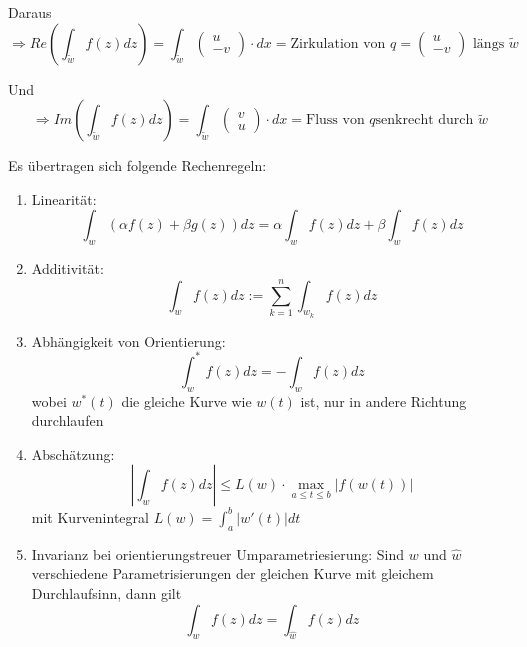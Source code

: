 \documentclass[10pt,a4paper]{article}
\begin{document}
Daraus $$\Rightarrow Re \left( \int_{\tilde{w}} f(z) dz \right) = \int_{\tilde{w}} \begin{pmatrix}
u \\ -v
\end{pmatrix} \cdot dx = \text{Zirkulation von } q=\begin{pmatrix}
u \\ -v
\end{pmatrix} \text{ längs } \tilde{w}$$

Und $$\Rightarrow Im(\int_{\tilde{w}} f(z) dz) = \int_{\tilde{w}} \begin{pmatrix}
v \\ u
\end{pmatrix} \cdot dx = \text{Fluss von } q  \text{senkrecht durch } \tilde{w}$$


Es übertragen sich folgende Rechenregeln:

\begin{enumerate}

\item Linearität: $$\int_{w} (\alpha f(z) + \beta g(z)) dz = \alpha \int_{w} f(z) dz + \beta \int_{w} f(z) dz$$
\item Additivität: $$\int_{w} f(z) dz := \sum_{k=1}^{n} \int_{w_k} f(z) dz$$
\item Abhängigkeit von Orientierung: $$\int_{w}^{*} f(z) dz = - \int_{w} f(z) dz$$ wobei $w^{*}(t)$ die gleiche Kurve wie $w(t)$ ist, nur in andere Richtung durchlaufen
\item Abschätzung: $$\left|\int_{w} f(z) dz \right| \leq L(w) \cdot \max\limits_{a \leq t \leq b} |f(w(t))|$$ mit Kurvenintegral $L(w)=\int_{a}^{b} |w'(t)| dt$
\item Invarianz bei orientierungstreuer Umparametriesierung: Sind $w$ und $\hat{w}$ verschiedene Parametrisierungen der gleichen Kurve mit gleichem Durchlaufsinn, dann gilt $$\int_{w} f(z) dz = \int_{\hat{w}} f(z) dz$$
\end{enumerate}
\end{document}
